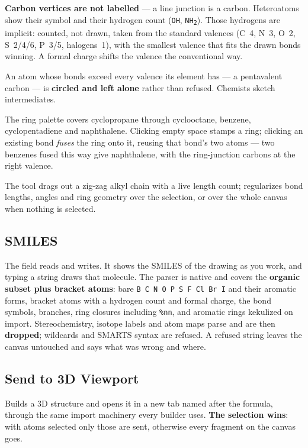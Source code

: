 \textbf{Carbon vertices are not labelled} --- a line junction is a carbon.
Heteroatoms show their symbol and their hydrogen count (\texttt{OH},
\texttt{NH\textsubscript{2}}). Those hydrogens are implicit: counted, not
drawn, taken from the standard valences (C~4, N~3, O~2, S~2/4/6, P~3/5,
halogens~1), with the smallest valence that fits the drawn bonds winning. A
formal charge shifts the valence the conventional way.

An atom whose bonds exceed every valence its element has --- a pentavalent
carbon --- is \textbf{circled and left alone} rather than refused. Chemists
sketch intermediates.

The ring palette covers cyclopropane through cyclooctane, benzene,
cyclopentadiene and naphthalene. Clicking empty space stamps a ring; clicking
an existing bond \emph{fuses} the ring onto it, reusing that bond's two atoms
--- two benzenes fused this way give naphthalene, with the ring-junction
carbons at the right valence.

The  tool drags out a zig-zag alkyl chain with a live length count;
 regularizes bond lengths, angles and ring geometry over the
selection, or over the whole canvas when nothing is selected.

\subsection{SMILES}

The  field reads and writes. It shows the SMILES of the drawing
as you work, and typing a string draws that molecule. The parser is native
and covers the \textbf{organic subset plus bracket atoms}: bare
\texttt{B C N O P S F Cl Br I} and their aromatic forms, bracket atoms with a
hydrogen count and formal charge, the bond symbols, branches, ring closures
including \texttt{\%nn}, and aromatic rings kekulized on import.
Stereochemistry, isotope labels and atom maps parse and are then
\textbf{dropped}; wildcards and SMARTS syntax are refused. A refused string
leaves the canvas untouched and says what was wrong and where.

\subsection{Send to 3D Viewport}

Builds a 3D structure and opens it in a new tab named after the formula,
through the same import machinery every builder uses. \textbf{The selection
wins}: with atoms selected only those are sent, otherwise every fragment on
the canvas goes.

